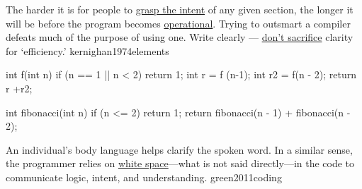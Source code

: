 \documentclass{article}
\begin{document}

  {The harder it is for people to \ul{grasp the intent} of any given section, the longer it will be before the program becomes \ul{operational}. Trying to outsmart a compiler defeats much of the purpose of using one. Write clearly --- \ul{don't sacrifice} clarity for `efficiency.'}
  {kernighan1974elements}

\begin{multicols}{2}
{\small\begin{ffcode}
int f(int n)
{
  if (n == 1 || n < 2)
    return 1;
  int r = f (n-1);
  int r2 = f(n - 2);
  return r +r2;
  }
\end{ffcode}
}
\par\columnbreak\par
{\small\begin{ffcode}
int fibonacci(int n) {
  if (n <= 2) {
    return 1;
  }
  return fibonacci(n - 1)
    + fibonacci(n - 2);
}
\end{ffcode}
}
\end{multicols}
\plush{}

  {An individual's body language helps clarify the spoken word. In a similar sense, the programmer relies on \ul{white space}---what is not said directly---in the code to communicate logic, intent, and understanding.}
  {green2011coding}


\end{document}
